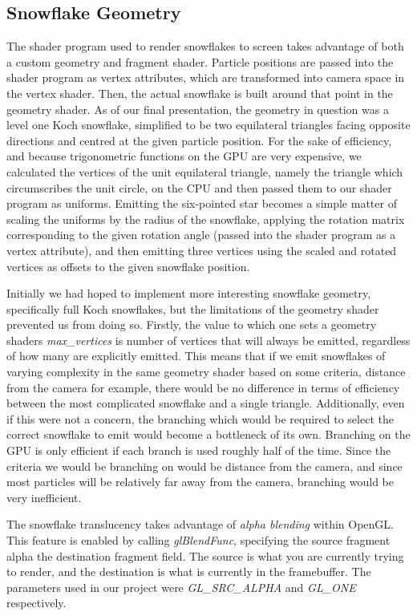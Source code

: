 \documentclass[conference]{acmsiggraph}
\begin{document}
\subsection{Snowflake Geometry}
The shader program used to render snowflakes to screen takes advantage of both a custom geometry and fragment shader. Particle positions are passed into the shader program as vertex attributes, which are transformed into camera space in the vertex shader. Then, the actual snowflake is built around that point in the geometry shader. As of our final presentation, the geometry in question was a level one Koch snowflake, simplified to be two equilateral triangles facing opposite directions and centred at the given particle position. For the sake of efficiency, and because trigonometric functions on the GPU are very expensive, we calculated the vertices of the unit equilateral triangle, namely the triangle which circumscribes the unit circle, on the CPU and then passed them to our shader program as uniforms. Emitting the six-pointed star becomes a simple matter of scaling the uniforms by the radius of the snowflake, applying the rotation matrix corresponding to the given rotation angle (passed into the shader program as a vertex attribute), and then emitting three vertices using the scaled and rotated vertices as offsets to the given snowflake position.

Initially we had hoped to implement more interesting snowflake geometry, specifically full Koch snowflakes, but the limitations of the geometry shader prevented us from doing so. Firstly, the value to which one sets a geometry shaders \textit{max\_vertices} is number of vertices that will always be emitted, regardless of how many are explicitly emitted. This means that if we emit snowflakes of varying complexity in the same geometry shader based on some criteria, distance from the camera for example, there would be no difference in terms of efficiency between the most complicated snowflake and a single triangle. Additionally, even if this were not a concern, the branching which would be required to select the correct snowflake to emit would become a bottleneck of its own. Branching on the GPU is only efficient if each branch is used roughly half of the time. Since the criteria we would be branching on would be distance from the camera, and since most particles will be relatively far away from the camera, branching would be very inefficient.

The snowflake translucency takes advantage of \textit{alpha blending} within OpenGL. This feature is enabled by calling \textit{glBlendFunc}, specifying the source fragment alpha the destination fragment field. The source is what you are currently trying to render, and the destination is what is currently in the framebuffer. The parameters used in our project were \textit{GL\_SRC\_ALPHA}  and \textit{GL\_ONE} respectively.
\end{document}
